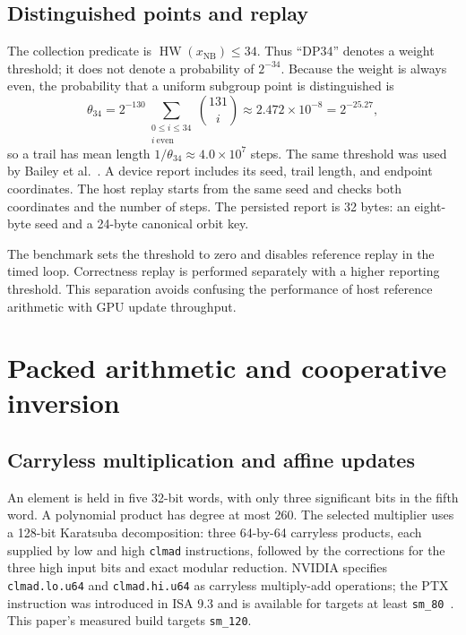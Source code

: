 \documentclass[11pt,a4paper]{article}
\newcommand{\HW}{\operatorname{HW}}
\newcommand{\code}[1]{\texttt{\small #1}}
\begin{document}
\subsection{Distinguished points and replay}\label{sec:dp}
The collection predicate is $\HW(x_{\mathrm{NB}})\leq34$. Thus ``DP34'' denotes a weight threshold; it does not denote a probability of $2^{-34}$. Because the weight is always even, the probability that a uniform subgroup point is distinguished is
\begin{equation}\label{eq:dpprob}
 \theta_{34}=2^{-130}\sum_{\substack{0\leq i\leq34\\ i\ \mathrm{even}}}\binom{131}{i}\approx2.472\times10^{-8}=2^{-25.27},
\end{equation}
so a trail has mean length $1/\theta_{34}\approx4.0\times10^{7}$ steps. The same threshold was used by Bailey et al.~\cite{bailey2009}. A device report includes its seed, trail length, and endpoint coordinates. The host replay starts from the same seed and checks both coordinates and the number of steps. The persisted report is 32 bytes: an eight-byte seed and a 24-byte canonical orbit key.

The benchmark sets the threshold to zero and disables reference replay in the timed loop. Correctness replay is performed separately with a higher reporting threshold. This separation avoids confusing the performance of host reference arithmetic with GPU update throughput.

\section{Packed arithmetic and cooperative inversion}\label{sec:arith}
\subsection{Carryless multiplication and affine updates}
An element is held in five 32-bit words, with only three significant bits in the fifth word. A polynomial product has degree at most 260. The selected multiplier uses a 128-bit Karatsuba decomposition: three 64-by-64 carryless products, each supplied by low and high \code{clmad} instructions, followed by the corrections for the three high input bits and exact modular reduction. NVIDIA specifies \code{clmad.lo.u64} and \code{clmad.hi.u64} as carryless multiply-add operations; the PTX instruction was introduced in ISA 9.3 and is available for targets at least \code{sm\_80}~\cite{nvidiaPTX}. This paper's measured build targets \code{sm\_120}.
\end{document}
